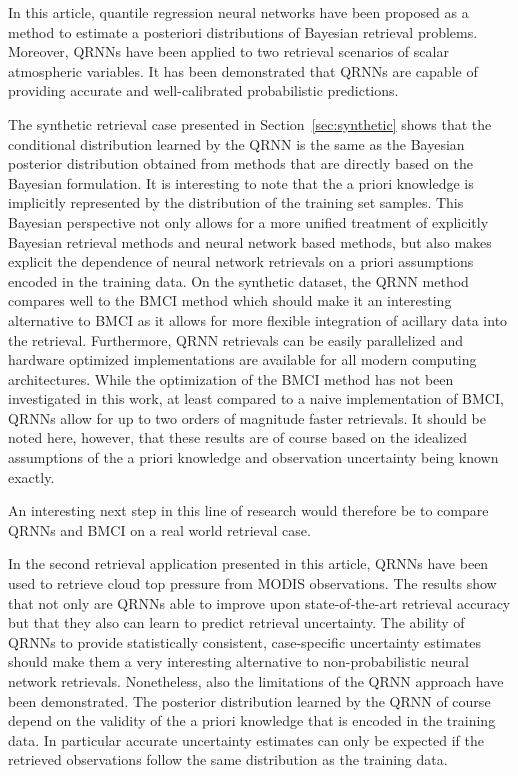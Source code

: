 \documentclass[journal abbreviation, manuscript]{copernicus}
\begin{document}
\conclusions  %

In this article, quantile regression neural networks have been proposed as a method
to estimate a posteriori distributions of Bayesian retrieval problems. Moreover,
QRNNs have been applied to two retrieval scenarios of scalar atmospheric variables.
It has been demonstrated that QRNNs are capable of providing accurate and
well-calibrated probabilistic predictions.

The synthetic retrieval case presented in Section~\ref{sec:synthetic} shows that
the conditional distribution learned by the QRNN is the same as the Bayesian
posterior distribution obtained from methods that are directly based on the
Bayesian formulation. It is interesting to note that the a priori knowledge is
implicitly represented by the distribution of the training set samples. This
Bayesian perspective not only allows for a more unified treatment of explicitly
Bayesian retrieval methods and neural network based methods, but also makes
explicit the dependence of neural network retrievals on a priori assumptions
encoded in the training data. On the synthetic dataset, the QRNN method compares
well to the BMCI method which should make it an interesting alternative to BMCI
as it allows for more flexible integration of acillary data into the retrieval.
Furthermore, QRNN retrievals can be easily parallelized and hardware optimized
implementations are available for all modern computing architectures. While the
optimization of the BMCI method has not been investigated in this work, at least
compared to a naive implementation of BMCI, QRNNs allow for up to two orders of
magnitude faster retrievals. It should be noted here, however, that these
results are of course based on the idealized assumptions of the a priori
knowledge and observation uncertainty being known exactly.

An interesting next step in this line of research would therefore be to compare
QRNNs and BMCI on a real world retrieval case.

In the second retrieval application presented in this article, QRNNs have been
used to retrieve cloud top pressure from MODIS observations. The results show
that not only are QRNNs able to improve upon state-of-the-art retrieval
accuracy but that they also can learn to predict retrieval uncertainty. The
ability of QRNNs to provide statistically consistent, case-specific uncertainty
estimates should make them a very interesting alternative to non-probabilistic
neural network retrievals. Nonetheless, also the limitations of the QRNN approach
have been demonstrated. The posterior distribution learned by the QRNN of course
depend on the validity of the a priori knowledge that is encoded in the
training data. In particular accurate uncertainty estimates can only be expected
if the retrieved observations follow the same distribution as the training data.
\end{document}
